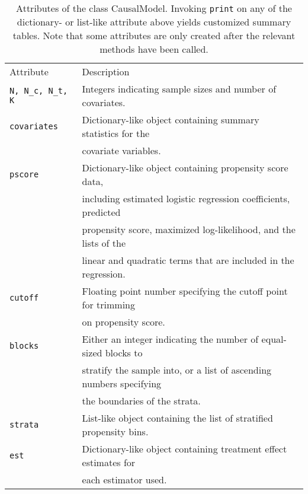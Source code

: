\documentclass[12pt]{article}
\theoremstyle{definition}
\theoremstyle{definition}
\theoremstyle{definition}
\theoremstyle{remark}
\begin{document}
\begin{table}[h]
\begin{center}\begin{tabular}{ll}
Attribute & Description \\
\texttt{N, N\_c, N\_t, K} & Integers indicating sample sizes and number of covariates. \\
\texttt{covariates} & Dictionary-like object containing summary statistics for the \\
& covariate variables. \\
\texttt{pscore} & Dictionary-like object containing propensity score data, \\
& including estimated logistic regression coefficients, predicted \\
& propensity score, maximized log-likelihood, and the lists of the \\
& linear and quadratic terms that are included in the regression. \\
\texttt{cutoff} & Floating point number specifying the cutoff point for trimming \\
& on propensity score.\\
\texttt{blocks} & Either an integer indicating the number of equal-sized blocks to \\
& stratify the sample into, or a list of ascending numbers specifying \\
& the boundaries of the strata. \\
\texttt{strata} & List-like object containing the list of stratified propensity bins. \\
\texttt{est} & Dictionary-like object containing treatment effect estimates for \\
& each estimator used.
\end{tabular}\end{center}
\caption{Attributes of the class CausalModel. Invoking \texttt{print} on any of the dictionary- or list-like attribute above yields customized summary tables. Note that some attributes are only created after the relevant methods have been called.}  \label{tab.a}
\end{table}
\end{document}
